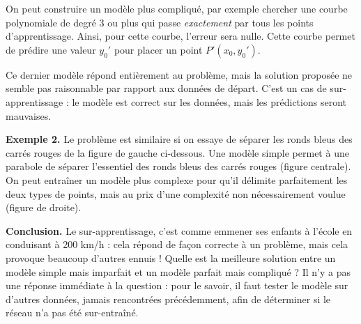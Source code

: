 
On peut construire un modèle plus compliqué, par exemple chercher une courbe polynomiale de degré $3$ ou plus qui passe \emph{exactement} par tous les points d'apprentissage. Ainsi, pour cette courbe, l'erreur sera nulle. Cette courbe permet de prédire une valeur $y_0'$ pour placer un point $P'(x_0,y_0')$. 

Ce dernier modèle répond entièrement au problème, mais la solution proposée ne semble pas raisonnable par rapport aux données de départ. C'est un cas de sur-apprentissage : le modèle est correct sur les données, mais les prédictions seront mauvaises.

\bigskip

\textbf{Exemple 2.}
Le problème est similaire si on essaye de séparer les ronds bleus des carrés rouges de la figure de gauche ci-dessous. Une modèle simple permet à une parabole de séparer l'essentiel des ronds bleus des carrés rouges (figure centrale). On peut entraîner un modèle plus complexe pour qu'il délimite parfaitement les deux types de points, mais au prix d'une complexité non nécessairement voulue (figure de droite).

\textbf{Conclusion.}
Le sur-apprentissage, c'est comme emmener ses enfants à l'école en conduisant à 200 km/h : cela répond de façon correcte à un problème, mais cela provoque beaucoup d'autres ennuis !  
Quelle est la meilleure solution entre un modèle simple mais imparfait et un modèle parfait mais compliqué ? Il n'y a pas une réponse immédiate à la question : pour le savoir, il faut tester le modèle sur d'autres données, jamais rencontrées précédemment, afin de déterminer si le réseau n'a pas été sur-entraîné.
